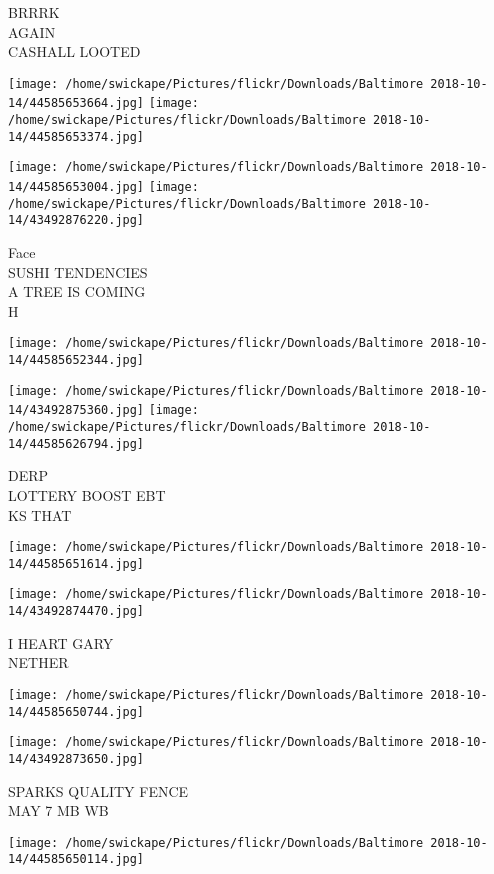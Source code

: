 \documentclass[10pt,letterpaper]{article}
\begin{document}
BRRRK\\
AGAIN\\
CASHALL LOOTED
\pagebreak

\texttt{[image: /home/swickape/Pictures/flickr/Downloads/Baltimore 2018-10-14/44585653664.jpg]}
\texttt{[image: /home/swickape/Pictures/flickr/Downloads/Baltimore 2018-10-14/44585653374.jpg]}

\texttt{[image: /home/swickape/Pictures/flickr/Downloads/Baltimore 2018-10-14/44585653004.jpg]}
\texttt{[image: /home/swickape/Pictures/flickr/Downloads/Baltimore 2018-10-14/43492876220.jpg]}

Face\\
SUSHI TENDENCIES\\
A TREE IS COMING\\
H
\pagebreak

\texttt{[image: /home/swickape/Pictures/flickr/Downloads/Baltimore 2018-10-14/44585652344.jpg]}

\vspace{0.25in}
\texttt{[image: /home/swickape/Pictures/flickr/Downloads/Baltimore 2018-10-14/43492875360.jpg]}
\texttt{[image: /home/swickape/Pictures/flickr/Downloads/Baltimore 2018-10-14/44585626794.jpg]}

DERP\\
LOTTERY BOOST EBT\\
KS THAT
\pagebreak

\texttt{[image: /home/swickape/Pictures/flickr/Downloads/Baltimore 2018-10-14/44585651614.jpg]}

\vspace{0.25in}
\texttt{[image: /home/swickape/Pictures/flickr/Downloads/Baltimore 2018-10-14/43492874470.jpg]}

I HEART GARY\\
NETHER
\pagebreak

\texttt{[image: /home/swickape/Pictures/flickr/Downloads/Baltimore 2018-10-14/44585650744.jpg]}

\vspace{0.25in}
\texttt{[image: /home/swickape/Pictures/flickr/Downloads/Baltimore 2018-10-14/43492873650.jpg]}

SPARKS QUALITY FENCE\\
MAY 7 MB WB
\pagebreak

\texttt{[image: /home/swickape/Pictures/flickr/Downloads/Baltimore 2018-10-14/44585650114.jpg]}
\end{document}
